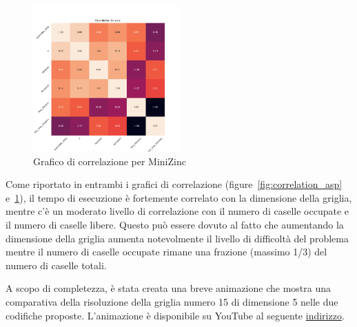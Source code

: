\begin{figure}
    \centering
    \includegraphics[width=0.5\textwidth]{img/correlation_mzn}
    \caption{Grafico di correlazione per MiniZinc}
    \label{fig:correlation_mzn}
\end{figure}

Come riportato in entrambi i grafici di correlazione (figure~\ref{fig:correlation_asp} e~\ref{fig:correlation_mzn}), il tempo di esecuzione è fortemente correlato con la dimensione della griglia, mentre c'è un moderato livello di correlazione con il numero di caselle occupate e il numero di caselle libere.
Questo può essere dovuto al fatto che aumentando la dimensione della griglia aumenta notevolmente il livello di difficoltà del problema mentre il numero di caselle occupate rimane una frazione (massimo 1/3) del numero di caselle totali.

A scopo di completezza, è stata creata una breve animazione che mostra una comparativa della risoluzione della griglia numero 15 di dimensione 5 nelle due codifiche proposte.
L'animazione è disponibile su YouTube al seguente \href{https://youtu.be/e243VU-qNLE}{indirizzo}.